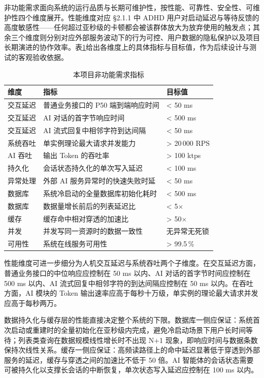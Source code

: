 \par 非功能需求面向系统的运行品质与长期可维护性，按性能、可靠性、安全性、可维护性四个维度展开。性能维度对应 §2.1.1 中 ADHD 用户对启动延迟与等待反馈的高度敏感性——任何超过亚秒级的卡顿都会被该群体放大为放弃使用的触发点；其余三个维度则分别对应外部服务波动下的行为可控、用户数据的隐私保护以及项目长期演进的协作效率。表\ref{tab:non-functional-requirements}给出各维度上的具体指标与目标值，作为后续设计与测试的客观验收依据。
\begin{table}[htbp]
  \centering
  \caption{本项目非功能需求指标}
  \label{tab:non-functional-requirements}
  \begin{tabular}{p{2cm}p{7cm}p{3cm}}
    \hline
    维度 & 指标 & 目标值 \\
    \hline
    交互延迟 & 普通业务接口的 P50 端到端响应时间 & < 50 ms \\
    交互延迟 & AI 对话的首字节响应时间 & < 500 ms \\
    交互延迟 & AI 流式回复中相邻字符到达间隔 & < 50 ms \\
    系统吞吐 & 单实例理论最大请求并发能力 & > 20\,000 RPS \\
    AI 吞吐 & 输出 Token 的吞吐率 & > 100 ktps \\
    持久化 & 会话状态持久化的单次写入延迟 & < 100 ms \\
    异常处理 & 外部 AI 服务异常时的快速失败时延 & < 50 ms \\
    数据库 & 系统冷启动的全量数据库初始化耗时 & < 500 ms \\
    数据库 & 数据量增长前后的列表延迟比 & < 5$\times$ \\
    缓存 & 缓存命中相对穿透的加速比 & > 50$\times$ \\
    并发 & 并发写同一资源时的数据一致性 & 无异常无死锁 \\
    可用性 & 系统在线服务可用性 & > 99.5\,\% \\
    \hline
  \end{tabular}
\end{table}

\par 性能维度可进一步细分为人机交互延迟与系统吞吐两个子维度。在交互延迟方面，普通业务接口的中位响应应控制在 50 ms 以内、AI 对话的首字节时间应控制在 500 ms 以内、AI 流式回复中相邻字符的到达间隔应控制在 50 ms 以内。在吞吐方面，AI 模块的 Token 输出速率应高于每秒十万级，单实例的理论最大请求并发应高于每秒两万。

\par 数据持久化与缓存层的性能直接决定整个系统的下限。数据库一侧应保证：系统首次启动或重建时的全量初始化在亚秒级内完成，避免冷启动场景下用户长时间等待；列表类查询在数据规模线性增长时不出现 N+1 现象，即响应时间与数据条数保持次线性关系。缓存一侧应保证：高频读路径上的命中延迟显著低于穿透到外部服务的延迟，缓存与穿透之间的加速比不低于 50 倍。AI 智能体的会话状态需要可被持久化以支撑长会话的中断恢复，单次状态写入延迟应控制在 100 ms 以内。

